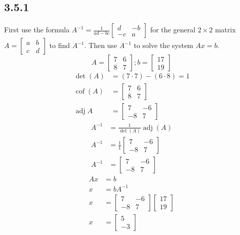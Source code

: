 \documentclass{article}
\DeclareMathOperator{\cof}{cof}
\DeclareMathOperator{\adj}{adj}
\begin{document}
\subsection{3.5.1}
First use the formula $ A^{-1} = \frac{1}{ad - bc} \begin{bmatrix} d & -b \\ -c & a \end{bmatrix} $ for the general $ 2 \times 2 $ matrix $ A = \begin{bmatrix} a & b \\ c & d \end{bmatrix} $ to find $ A^{-1} $. Then use $ A^{-1} $ to solve the system $ Ax = b $.
\begin{equation*}
	A =
		\begin{bmatrix}
			7 & 6 \\
			8 & 7
		\end{bmatrix};
	b =
		\begin{bmatrix}
			17 \\
			19
		\end{bmatrix}
\end{equation*}
\begin{align*}
	\det(A) & = (7 \cdot 7) - (6 \cdot 8) = 1 \\
	\cof(A) & =
		\begin{bmatrix}
			7 & 6 \\
			8 & 7
		\end{bmatrix} \\
	\adj{A} & =
		\begin{bmatrix}
			7 & -6 \\
			-8 & 7
		\end{bmatrix}
\end{align*}
\begin{align*}
	A^{-1} & = \frac{1}{\det(A)}\adj(A) \\
	A^{-1} & = \frac{1}{1}
		\begin{bmatrix}
			7 & -6 \\
			-8 & 7
		\end{bmatrix} \\
	A^{-1} & = 
		\begin{bmatrix}
			7 & -6 \\
			-8 & 7
		\end{bmatrix}
\end{align*}
\begin{align*}
	Ax & = b \\
	x & = bA^{-1} \\
	x & =
		\begin{bmatrix}
			7 & -6 \\
			-8 & 7
		\end{bmatrix}
		\begin{bmatrix}
			17 \\
			19
		\end{bmatrix} \\
	x & =
		\begin{bmatrix}
			5 \\
			-3
		\end{bmatrix}
\end{align*}
\end{document}
